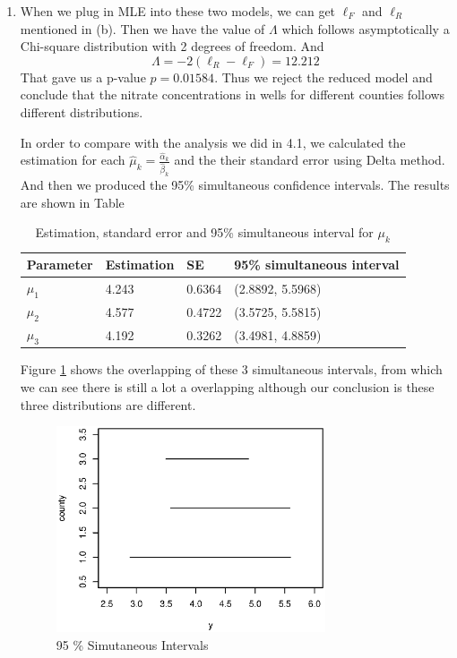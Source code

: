 \documentclass{article}
\begin{document}
\begin{enumerate}[leftmargin = 0 em, label = 4.\arabic*., font = \bfseries]
\begin{enumerate}
\begin{table}[!htb]
		\end{table}


		\item 
		When we plug in MLE into these two models, we can get $\ell_F$ and $\ell_R$ mentioned in (b). Then we have the value of $\Lambda$ which follows asymptotically a Chi-square distribution with 2 degrees of freedom. And
		\[\Lambda = -2 (\ell_R - \ell_F) = 12.212\]
		That gave us a p-value $p = 0.01584$. Thus we reject the reduced model and conclude that the nitrate concentrations in wells for different counties follows different distributions.

		In order to compare with the analysis we did in 4.1, we calculated the estimation for each $\hat{\mu}_k = \frac{\hat{\alpha}_k}{\hat{\beta}_k}$ and the their standard error using Delta method. And then we produced the 95\% simultaneous confidence intervals. The results are shown in Table
		\begin{table}[!htb]
		   	\centering
		   	\caption{Estimation, standard error and 95\% simultaneous interval for $\mu_k$}
		   	\label{simu2}
		   	\begin{tabular}{llll}
		   	\toprule
		   		Parameter & Estimation & SE & 95\% simultaneous interval\\ 
		   		\midrule
		   		$\mu_1$ & 4.243 & 0.6364 & (2.8892, 5.5968)\\
		   		$\mu_2$ & 4.577 & 0.4722 & (3.5725, 5.5815)\\
		   		$\mu_3$ & 4.192 & 0.3262 & (3.4981, 4.8859)\\
		   		\bottomrule
		   	\end{tabular}
		   \end{table}  

		Figure \ref{simu2_g} shows the overlapping of these 3 simultaneous intervals, from which we can see there is still a lot a overlapping although our conclusion is these three distributions are different. 
     \begin{figure}[!htb]
	 	\centering
	 	\includegraphics[width = 0.75\textwidth]{simu2.eps}
	 	\caption{95 \% Simutaneous Intervals}
	 	\label{simu2_g}
	 \end{figure}


\end{enumerate}
\end{enumerate}
\end{document}
